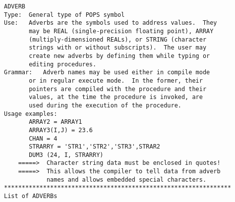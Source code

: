 \vskip 0.5pt
\bbve\begin{verbatim}
ADVERB
Type:  General type of POPS symbol
Use:   Adverbs are the symbols used to address values.  They
       may be REAL (single-precision floating point), ARRAY
       (multiply-dimensioned REALs), or STRING (character
       strings with or without subscripts).  The user may
       create new adverbs by defining them while typing or
       editing procedures.
Grammar:   Adverb names may be used either in compile mode
       or in regular execute mode.  In the former, their
       pointers are compiled with the procedure and their
       values, at the time the procedure is invoked, are
       used during the execution of the procedure.
Usage examples:
       ARRAY2 = ARRAY1
       ARRAY3(I,J) = 23.6
       CHAN = 4
       STRARRY = 'STR1','STR2','STR3',STRAR2
       DUM3 (24, I, STRARRY)
    =====>  Character string data must be enclosed in quotes!
    =====>  This allows the compiler to tell data from adverb
            names and allows embedded special characters.
****************************************************************
List of ADVERBs


\end{verbatim}
